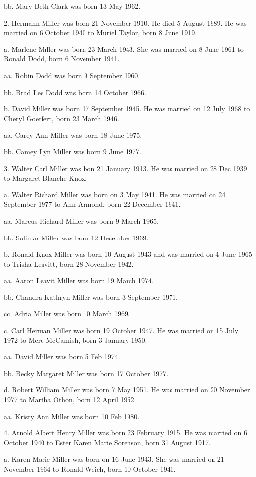 \documentclass[a4paper]{article}
\begin{document}
bb. Mary Beth Clark was born 13 May 1962.

2. Hermann Miller was born 21 November 1910. He died 5 August 1989. He was married on 6 October 1940 to Muriel Taylor, born 8 June 1919.

a. Marlene Miller was born 23 March 1943.  She was married on 8 June 1961 to Ronald Dodd, born 6 November 1941.

aa. Robin Dodd was born 9 September 1960.

bb. Brad Lee Dodd was born 14 October 1966.

b. David Miller was born 17 September 1945.  He was married on 12 July 1968 to Cheryl Goetfert, born 23 March 1946.

aa. Carey Ann Miller was born 18 June 1975.

bb. Camey Lyn Miller was born 9 June 1977.

3. Walter Carl Miller was bon 21 January 1913.  He was married on 28 Dec 1939 to Margaret Blanche Knox.

a. Walter Richard Miller was born on 3 May 1941.  He was married on 24 September 1977 to Ann Armond, born 22 December 1941.

aa. Marcus Richard Miller was born 9 March 1965.

bb. Solimar Miller was born 12 December 1969.

b. Ronald Knox Miller was born 10 August 1943 and was married on 4 June 1965 to Trisha Leavitt, born 28 November 1942.

aa. Aaron Leavit Miller was born 19 March 1974.

bb. Chandra Kathryn Miller was born 3 September 1971.

cc. Adria Miller was born 10 March 1969.

c. Carl Herman Miller was born 19 October 1947.  He was married on 15 July 1972 to Mere McCamish, born 3 January 1950.

aa. David Miller was born 5 Feb 1974.

bb. Becky Margaret Miller was born 17 October 1977.

d. Robert William Miller was born 7 May 1951.  He was married on 20 November 1977 to Martha Othon, born 12 April 1952.
 
aa.  Kristy Ann Miller was born 10 Feb 1980.

4. Arnold Albert Henry Miller was born 23 February 1915.  He was married on 6 October 1940 to Ester Karen Marie Sorenson, born 31 August 1917.

a. Karen Marie Miller was born on 16 June 1943.  She was married on 21 November 1964 to Ronald Weich, born 10 October 1941.
 
\end{document}

